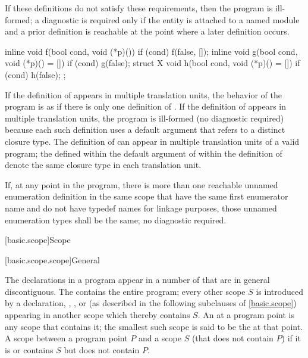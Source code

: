 \pnum
If these definitions do not satisfy these requirements,
then the program is ill-formed;
a diagnostic is required only if
the entity is attached to a named module and
a prior definition is reachable at the point where a later definition occurs.

\pnum
\begin{example}
\begin{codeblock}
inline void f(bool cond, void (*p)()) {
  if (cond) f(false, []{});
}
inline void g(bool cond, void (*p)() = []{}) {
  if (cond) g(false);
}
struct X {
  void h(bool cond, void (*p)() = []{}) {
    if (cond) h(false);
  }
};
\end{codeblock}

If the definition of  appears in multiple translation units,
the behavior of the program is as if
there is only one definition of .
If the definition of  appears in multiple translation units,
the program is ill-formed (no diagnostic required) because
each such definition uses a default argument that
refers to a distinct  closure type.
The definition of  can appear
in multiple translation units of a valid program;
the  defined within
the default argument of  within the definition of 
denote the same closure type in each translation unit.
\end{example}

\pnum
If, at any point in the program,
there is more than one
reachable unnamed enumeration definition in the same scope
that have the same first enumerator name and
do not have typedef names for linkage purposes,
those unnamed enumeration types shall be the same; no diagnostic required.

[basic.scope]{Scope}%

[basic.scope.scope]{General}

\pnum
The declarations in a program appear in a number of 
that are in general discontiguous.
The  contains the entire program;
every other scope $S$ is introduced by a
declaration,
,
, or 
(as described in the following subclauses of \ref{basic.scope})
appearing in another scope which thereby contains $S$.
An  at a program point is any scope that contains it;
the smallest such scope is said to be the 
at that point.
A scope 
between a program point $P$ and a scope $S$
(that does not contain $P$) if it is or contains $S$ but does not contain $P$.

